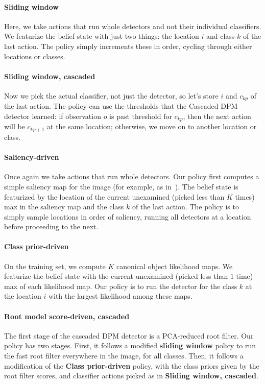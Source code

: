 \paragraph{Sliding window}
Here, we take actions that run whole detectors and not their individual classifiers.
We featurize the belief state with just two things: the location $i$ and class $k$ of the last action.
The policy simply increments these in order, cycling through either locations or classes.

\paragraph{Sliding window, cascaded}
Now we pick the actual classifier, not just the detector, so let's store $i$ and $c_{kp}$ of the last action.
The policy can use the thresholds that the Cascaded DPM detector learned: if observation $o$ is past threshold for $c_{kp}$, then the next action will be $c_{k{p+1}}$ at the same location; otherwise, we move on to another location or class.

\paragraph{Saliency-driven}
Once again we take actions that run whole detectors.
Our policy first computes a simple saliency map for the image (for example, as in~\cite{Alexe2010}).
The belief state is featurized by the location of the current unexamined (picked less than $K$ times) max in the saliency map and the class $k$ of the last action.
The policy is to simply sample locations in order of saliency, running all detectors at a location before proceeding to the next.

\paragraph{Class prior-driven}
On the training set, we compute $K$ canonical object likelihood maps.
We featurize the belief state with the current unexamined (picked less than $1$ time) max of each likelihood map.
Our policy is to run the detector for the class $k$ at the location $i$ with the largest likelihood among these maps.

\paragraph{Root model score-driven, cascaded}
The first stage of the cascaded DPM detector is a PCA-reduced root filter.
Our policy has two stages.
First, it follows a modified \textbf{sliding window} policy to run the fast root filter everywhere in the image, for all classes.
Then, it follows a modification of the \textbf{Class prior-driven} policy, with the class priors given by the root filter scores, and classifier actions picked as in \textbf{Sliding window, cascaded}.


